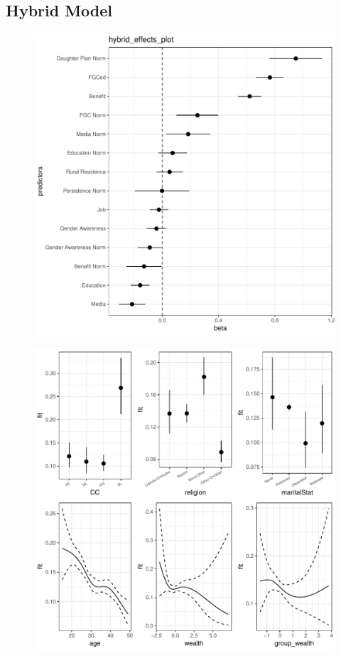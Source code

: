 \documentclass[12pt,]{article}
\begin{document}
\newpage

\subsection{Hybrid Model}
\begin{center}
\begin{figure}[h!]
\includegraphics[scale=0.7]{./git_push/hybrid_effects_plot.Rout.pdf}
\end{figure}
\end{center}

\begin{center}
\begin{figure}[h!]
\includegraphics[scale=0.7]{./git_push/hybrid_isoplots.Rout.pdf}
\end{figure}
\end{center}
\end{document}
